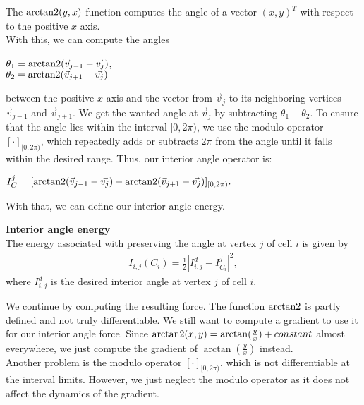 The $\operatorname{arctan2}(y,x)$ function computes the angle of a vector $(x,y)^T$ with respect to the positive $x$ axis. \\
With this, we can compute the angles 
\begin{center}
	
	$\theta_1 = \operatorname{arctan2}( \vec{v}_{j-1} - \vec{v_j} )$, \\
	$\theta_2 = \operatorname{arctan2}( \vec{v}_{j+1} - \vec{v_j} )$
	
\end{center}
between the positive $x$ axis and the vector from $\vec{v}_j$ to its neighboring vertices $\vec{v}_{j-1}$ and $\vec{v}_{j+1}$. 
We get the wanted angle at $\vec{v}_j$ by subtracting $\theta_1 - \theta_2$.
To ensure that the angle lies within the interval $[0, 2\pi)$, we use the modulo operator $[ \cdot ]_{[0,2\pi)}$, which repeatedly adds or subtracts $2\pi$ from the angle until it falls within the desired range.
Thus, our interior angle operator is: 
\begin{center}
	$
	I^j_C = [\operatorname{arctan2}(\vec{v}_{j-1} - \vec{v_j}) - \operatorname{arctan2}(\vec{v}_{j+1} - \vec{v_j})]_{[0,2\pi)}.
	$
\end{center}

With that, we can define our interior angle energy. 
\begin{definition} \textbf{Interior angle energy} \\
	The energy associated with preserving the angle at vertex $j$ of cell $i$ is given by
	\begin{align*}
		I_{i, j}(C_i) = \frac{1}{2}| I_{i, j}^d - I^j_{C_i} |^2, 
	\end{align*}
	where $I_{i, j}^d$ is the desired interior angle at vertex $j$ of cell $i$. 
\end{definition}


We continue by computing the resulting force. 
The function $\operatorname{arctan2}$ is partly defined and not truly differentiable. 
We still want to compute a gradient to use it for our interior angle force. 
Since $\operatorname{arctan2}(x,y) = \arctan(\frac{y}{x}) + constant$ almost everywhere, we just compute the gradient of $\arctan(\frac{y}{x})$ instead. \\
Another problem is the modulo operator $[ \cdot ]_{[0,2\pi)}$, which is not differentiable at the interval limits.
However, we just neglect the modulo operator as it does not affect the dynamics of the gradient.

